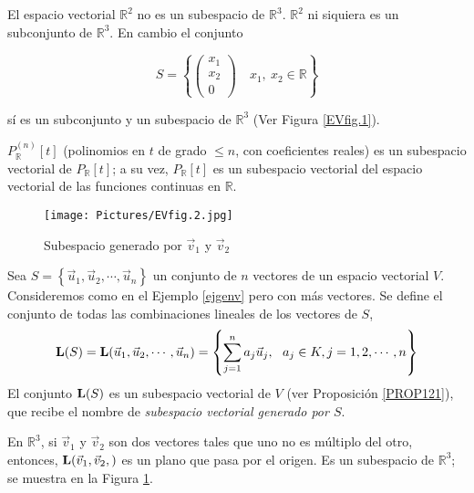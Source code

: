 \begin{remark}
El espacio vectorial $\mathbb{R}^2$ no es un subespacio de $\mathbb{R}^3$. $\mathbb{R}^2$ ni siquiera es un subconjunto  de $\mathbb{R}^3$.  En cambio el conjunto


$$S=\left \{ \left( \begin{array}{c} x_1 \\ x_2 \\ 0\end{array}\right) \quad x_1,~x_2 \in \mathbb{R}   \right\}$$

\bigskip
\noindent
sí es un subconjunto y un subespacio de $\mathbb{R}^3$ (Ver Figura \ref{EVfig.1}).
\end{remark}


\begin{example}
 $P_\mathbb{R}^{(n)}\left[t\right]$ (polinomios en $t$  de grado $\leq n$, con coeficientes reales) es un subespacio vectorial de $P_\mathbb{R}\left[t\right]$; a su vez, $P_\mathbb{R}\left[t\right]$ es un subespacio vectorial  del espacio vectorial de las funciones continuas en $\mathbb{R}$.
\end{example}

\begin{figure}
    \centering
    \texttt{[image: Pictures/EVfig.2.jpg]}
    \caption{Subespacio generado por $\vec{v}_1$ y $\vec{v}_2$ }
    \label{EVfig. 2}
\end{figure}


\begin{example}
\label{ejemploLS}
Sea $S=\left\{\vec{u}_1,\vec{u}_2,\cdots,  \vec{u}_n\right\}$ un conjunto de $n$ vectores de un espacio vectorial $V$. Consideremos como en el Ejemplo \ref{ejgenv}  pero con más vectores.
Se define el conjunto de todas las combinaciones lineales de los vectores de $S$, 
$$\bold{L}(S)=\bold{L}(\vec{u}_1,\vec{u}_2,\cdots,  \vec{u}_n)=\left\{\sum_{j=1}^{n}a_j\vec{u}_j,  ~ ~a_j\in K, j=1,2,\cdots,n\right\}$$
El conjunto $\bold{L}(S)$ es un subespacio vectorial de $V$ (ver Proposición \ref{PROP121}), que recibe el nombre de \textsl{subespacio vectorial generado por $S$}. 

En $\mathbb{R}^3$, si $\vec{v}_1$ y $\vec{v}_2$ son dos vectores tales que uno no es múltiplo del otro, entonces,  $\bold{L}(\vec{v}_1,\vec{v}_2,  )$ es un plano que pasa por el origen.  Es un subespacio de $\mathbb{R}^3$; se muestra en la  Figura \ref{EVfig. 2}.




\end{example}


